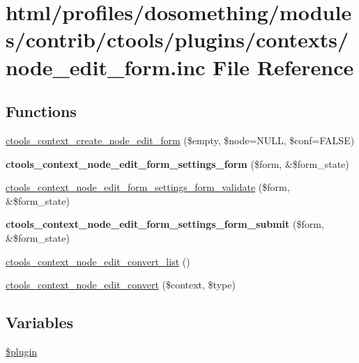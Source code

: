 \hypertarget{node__edit__form_8inc}{
\section{html/profiles/dosomething/modules/contrib/ctools/plugins/contexts/node\_\-edit\_\-form.inc File Reference}
\label{node__edit__form_8inc}
}
\subsection*{Functions}
\begin{DoxyCompactItemize}
\item 
\hyperlink{node__edit__form_8inc_a29881827e4ad81240c15854d7ad36aba}{ctools\_\-context\_\-create\_\-node\_\-edit\_\-form} (\$empty, \$node=NULL, \$conf=FALSE)
\item 
\hypertarget{node__edit__form_8inc_a18aaa50092495e93ca21fdcd7e3e574e}{
{\bfseries ctools\_\-context\_\-node\_\-edit\_\-form\_\-settings\_\-form} (\$form, \&\$form\_\-state)}
\label{node__edit__form_8inc_a18aaa50092495e93ca21fdcd7e3e574e}

\item 
\hyperlink{node__edit__form_8inc_a5985cb430ed6cbdbffb2bcd943977c27}{ctools\_\-context\_\-node\_\-edit\_\-form\_\-settings\_\-form\_\-validate} (\$form, \&\$form\_\-state)
\item 
\hypertarget{node__edit__form_8inc_a893739913223c278741badf2272915cc}{
{\bfseries ctools\_\-context\_\-node\_\-edit\_\-form\_\-settings\_\-form\_\-submit} (\$form, \&\$form\_\-state)}
\label{node__edit__form_8inc_a893739913223c278741badf2272915cc}

\item 
\hyperlink{node__edit__form_8inc_a0dbe2d1dee992d9ba97df1be41bbaa11}{ctools\_\-context\_\-node\_\-edit\_\-convert\_\-list} ()
\item 
\hyperlink{node__edit__form_8inc_a23871551967cdac94aa4b64b71dfd7d8}{ctools\_\-context\_\-node\_\-edit\_\-convert} (\$context, \$type)
\end{DoxyCompactItemize}
\subsection*{Variables}
\begin{DoxyCompactItemize}
\item 
\hyperlink{node__edit__form_8inc_ada8a7130088351710bb02ed622d6bf65}{\$plugin}
\end{DoxyCompactItemize}


